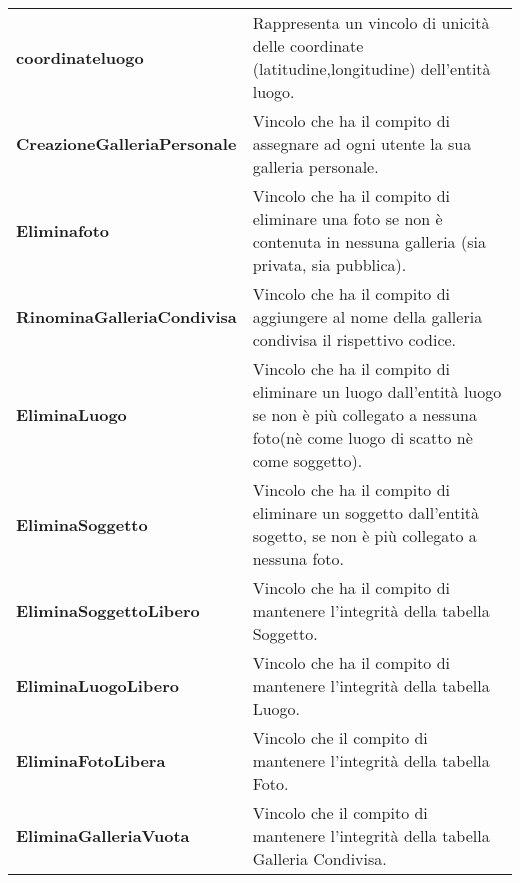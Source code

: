\begin{xltabular}{\textwidth}{l X}
        \textbf{coordinateluogo} & Rappresenta un vincolo di unicità delle coordinate (latitudine,longitudine) dell'entità luogo. \\

        \textbf{CreazioneGalleriaPersonale} & Vincolo che ha il compito di assegnare ad ogni utente la sua galleria personale. \\

        \textbf{Eliminafoto} & Vincolo che ha il compito di eliminare una foto se non è contenuta in nessuna galleria (sia privata, sia pubblica).\\

        \textbf{RinominaGalleriaCondivisa} & Vincolo che ha il compito di aggiungere al nome della galleria condivisa il rispettivo codice. \\

        \textbf{EliminaLuogo} & Vincolo che ha il compito di eliminare un luogo dall'entità luogo se non è più collegato a nessuna foto(nè come luogo di scatto nè come soggetto). \\

        \textbf{EliminaSoggetto} & Vincolo che ha il compito di eliminare un soggetto dall'entità sogetto, se non è più collegato a nessuna foto. \\
\hline
        \textbf{EliminaSoggettoLibero} & Vincolo che ha il compito di mantenere l'integrità della tabella Soggetto. \\

        \textbf{EliminaLuogoLibero} & Vincolo che ha il compito di mantenere l'integrità della tabella Luogo. \\

        \textbf{EliminaFotoLibera} & Vincolo che il compito di mantenere l'integrità della tabella Foto. \\

        \textbf{EliminaGalleriaVuota} & Vincolo che il compito di mantenere l'integrità della tabella Galleria Condivisa. \\

 \end{xltabular}
\endgroup